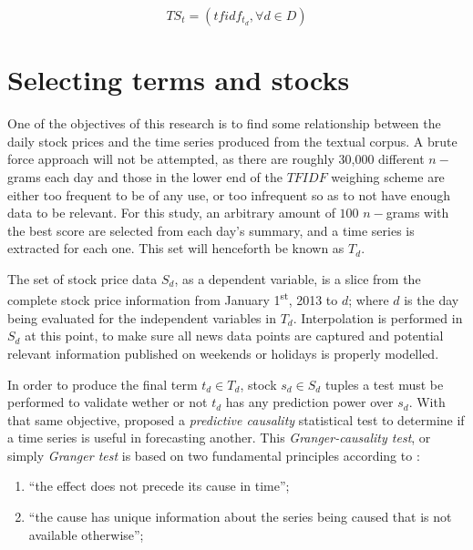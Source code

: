 \documentclass[conference,11pt]{IEEEtran}
\begin{document}
\[TS_t=({tfidf_{t_d}}, \forall d \in D)\]

\section{Selecting terms and stocks}
One of the objectives of this research is to find some relationship between the daily stock prices and the time series produced from the textual corpus. A brute force approach will not be attempted, as there are roughly 30,000 different \(n-\)grams each day and those in the lower end of the \(TFIDF\) weighing scheme are either too frequent to be of any use, or too infrequent so as to not have enough data to be relevant. For this study, an arbitrary amount of \(100\) \(n-\)grams with the best score are selected from each day's summary, and a time series is extracted for each one. This set will henceforth be known as \(T_d\).

\par
The set of stock price data \(S_d\), as a dependent variable, is a slice from the complete stock price information from January 1\textsuperscript{st}, 2013 to \(d\); where \(d\) is the day being evaluated for the independent variables in \(T_d\). Interpolation is performed in \(S_d\) at this point, to make sure all news data points are captured and potential relevant information published on weekends or holidays is properly modelled.

\par
In order to produce the final term \(t_d \in T_d\), stock \(s_d \in S_d\) tuples a test must be performed to validate wether or not \(t_d\) has any prediction power over \(s_d\). With that same objective, \citep{Granger1969,Granger1980} proposed a \textit{predictive causality} statistical test to determine if a time series is useful in forecasting another. This \textit{Granger-causality test}, or simply \textit{Granger test} is based on two fundamental principles  according to \citep{eichler2012}:
\begin{enumerate}
\item ``the effect does not precede its cause in time'';
\item ``the cause has unique information about the series being caused that is not available otherwise'';
\end{enumerate}
\end{document}
